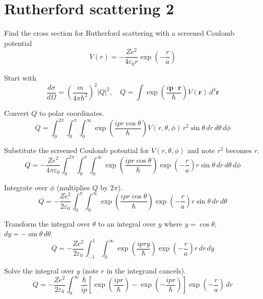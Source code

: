 

\section*{Rutherford scattering 2}

Find the cross section for Rutherford scattering with a screened Coulomb potential
\begin{equation*}
V(r)=-\frac{Ze^2}{4\varepsilon_0r}\exp\left(-\frac{r}{a}\right)
\end{equation*}

Start with
\begin{equation*}
\frac{d\sigma}{d\Omega}=
\left(\frac{m}{4\pi\hbar^2}\right)^2|Q|^2,\quad
Q=\int\exp\left(\frac{i\mathbf p\cdot\mathbf r}{\hbar}\right)V(\mathbf r)\,d^3\mathbf r
\end{equation*}

Convert $Q$ to polar coordinates.
\begin{equation*}
Q=\int_0^{2\pi}
\int_0^\pi
\int_0^\infty
\exp\left(\frac{ipr\cos\theta}{\hbar}\right)V(r,\theta,\phi)
\,r^2\sin\theta\,dr\,d\theta\,d\phi
\end{equation*}

Substitute the screened Coulomb potential for $V(r,\theta,\phi)$ and note $r^2$ becomes $r$.
\begin{equation*}
Q=-\frac{Ze^2}{4\pi\varepsilon_0}
\int_0^{2\pi}
\int_0^\pi
\int_0^\infty
\exp\left(\frac{ipr\cos\theta}{\hbar}\right)
\exp\left(-\frac{r}{a}\right)
r\sin\theta\,dr\,d\theta\,d\phi
\end{equation*}

Integrate over $\phi$ (multiplies $Q$ by $2\pi$).
\begin{equation*}
Q=-\frac{Ze^2}{2\varepsilon_0}
\int_0^\pi
\int_0^\infty
\exp\left(\frac{ipr\cos\theta}{\hbar}\right)
\exp\left(-\frac{r}{a}\right)
r\sin\theta\,dr\,d\theta
\end{equation*}

Transform the integral over $\theta$ to an integral over $y$
where $y=\cos\theta$, $dy=-\sin\theta\,d\theta$.
\begin{equation*}
Q=-\frac{Ze^2}{2\varepsilon_0}
\int_{-1}^1
\int_0^\infty
\exp\left(\frac{ipry}{\hbar}\right)
\exp\left(-\frac{r}{a}\right)
r\,dr\,dy
\end{equation*}

Solve the integral over $y$ (note $r$ in the integrand cancels).
\begin{equation*}
Q=-\frac{Ze^2}{2\varepsilon_0}
\int_0^\infty
\frac{\hbar}{ip}
\left[\exp\left(\frac{ipr}{\hbar}\right)-\exp\left(-\frac{ipr}{\hbar}\right)\right]
\exp\left(-\frac{r}{a}\right)
\,dr
\end{equation*}

